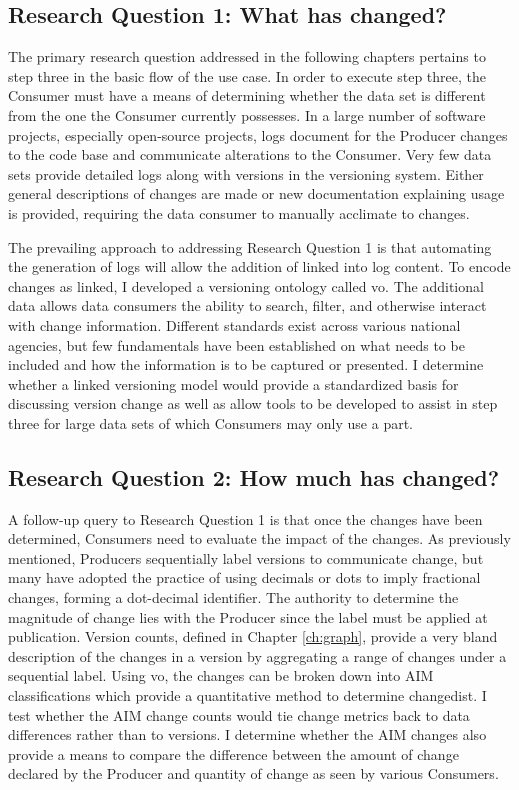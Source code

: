 \subsection{Research Question 1: What has changed?}

The primary research question addressed in the following chapters pertains to step three in the basic flow of the use case.
In order to execute step three, the Consumer must have a means of determining whether the data set is different from the one the Consumer currently possesses.
In a large number of software projects, especially open-source projects, \glspl{log} document for the Producer changes to the code base and communicate alterations to the Consumer.
Very few data sets provide detailed \glspl{log} along with \glspl{version} in the versioning system.
Either general descriptions of changes are made or new documentation explaining usage is provided, requiring the data consumer to manually acclimate to changes.

The prevailing approach to addressing Research Question 1 is that automating the generation of \glspl{log} will allow the addition of \gls{linked} into \gls{log} content.
To encode changes as \gls{linked}, I developed a versioning ontology called \gls{vo}.
The additional data allows data consumers the ability to search, filter, and otherwise interact with change information.
Different standards exist across various national agencies, but few fundamentals have been established on what needs to be included and how the information is to be captured or presented.
I determine whether a \gls{linked} versioning model would provide a standardized basis for discussing version change as well as allow tools to be developed to assist in step three for large data sets of which Consumers may only use a part.

\subsection{Research Question 2: How much has changed?}

A follow-up query to Research Question 1 is that once the changes have been determined, Consumers need to evaluate the impact of the changes.
As previously mentioned, Producers sequentially label \glspl{version} to communicate change, but many have adopted the practice of using decimals or dots to imply fractional changes, forming a dot-decimal identifier.
The authority to determine the magnitude of change lies with the Producer since the label must be applied at publication.
Version counts, defined in Chapter \ref{ch:graph}, provide a very bland description of the changes in a version by aggregating a range of changes under a sequential label.
Using \gls{vo}, the changes can be broken down into \gls{AIM} classifications which provide a quantitative method to determine \gls{changedist}.
I test whether the AIM change counts would tie change metrics back to data differences rather than to versions.
I determine whether the AIM changes also provide a means to compare the difference between the amount of change declared by the Producer and quantity of change as seen by various Consumers.

